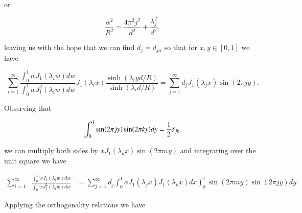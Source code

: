 or

\begin{equation}\label{eqn:coffeeCupWithBottom:880}
\frac{\alpha^2}{R^2} = \frac{4 \pi^2 j^2}{d^2} + \frac{\lambda_j^2}{d^2},
\end{equation}

leaving us with the hope that we can find $d_j = d_{j\alpha}$ so that for $x,y \in [0,1]$ we have

\begin{equation}\label{eqn:coffeeCupWithBottom:900}
\sum_{i=1}^\infty 
\frac{
\int_0^1 w J_1 (\lambda_i w) dw
}{
\int_0^1 w J_1^2 (\lambda_i w) dw
}
J_1(\lambda_i x) \frac{\sinh(\lambda_i y d/R)}{\sinh(\lambda_i d/R) } 
=
\sum_{j = 1}^\infty d_j J_1(\lambda_j x) \sin\left( 2 \pi j y \right).
\end{equation}

Observing that 

\begin{equation}\label{eqn:coffeeCupWithBottom:920}
\int_0^1 \sin(2 \pi j y) \sin(2 \pi k y) dy = \frac{1}{2} \delta_{j k}.
\end{equation}

we can multiply both sides by $x J_1(\lambda_k x) \sin ( 2 \pi m y )$ and integrating over the unit square we have

%
\begin{equation}\label{eqn:coffeeCupWithBottom:940}
\begin{aligned}
\sum_{i=1}^\infty 
&\frac{
\int_0^1 w J_1 (\lambda_i w) dw
}{
\int_0^1 w J_1^2 (\lambda_i w) dw
}
&=
\sum_{j = 1}^\infty d_j \int_0^1 x J_1(\lambda_j x) J_1( \lambda_k x) dx \int_0^1 \sin( 2 \pi m y ) \sin\left( 2 \pi j y \right) dy.
\end{aligned}
\end{equation}

Applying the orthogonality relations we have

